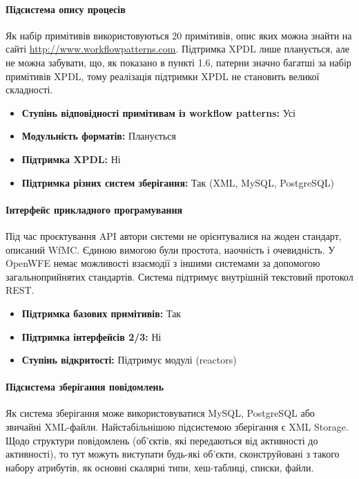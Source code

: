 \documentclass{memoir}
\begin{document}
\paragraph{Підсистема опису процесів}

Як набір примітивів використовуються 20 примітивів, опис яких можна знайти на сайті \url{http://www.workflowpatterns.com}. Підтримка XPDL лише планується, але не можна забувати, що, як показано в пункті 1.6, патерни значно багатші за набір примітивів XPDL, тому реалізація підтримки XPDL не становить великої складності.

\begin{itemize}
    \item \textbf{Ступінь відповідності примітивам із workflow patterns:} Усі
    \item \textbf{Модульність форматів:} Планується
    \item \textbf{Підтримка XPDL:} Ні
    \item \textbf{Підтримка різних систем зберігання:} Так (XML, MySQL, PostgreSQL)
\end{itemize}

\paragraph{Інтерфейс прикладного програмування}

Під час проєктування API автори системи не орієнтувалися на жоден стандарт, описаний WfMC. Єдиною вимогою були простота, наочність і очевидність. У OpenWFE немає можливості взаємодії з іншими системами за допомогою загальноприйнятих стандартів. Система підтримує внутрішній текстовий протокол REST.

\begin{itemize}
    \item \textbf{Підтримка базових примітивів:} Так
    \item \textbf{Підтримка інтерфейсів 2/3:} Ні
    \item \textbf{Ступінь відкритості:} Підтримує модулі (reactors)
\end{itemize}

\paragraph{Підсистема зберігання повідомлень}

Як система зберігання може використовуватися MySQL, PostgreSQL або звичайні XML-файли. Найстабільнішою підсистемою зберігання є XML Storage. Щодо структури повідомлень (об’єктів, які передаються від активності до активності), то тут можуть виступати будь-які об’єкти, сконструйовані з такого набору атрибутів, як основні скалярні типи, хеш-таблиці, списки, файли.
\end{document}
